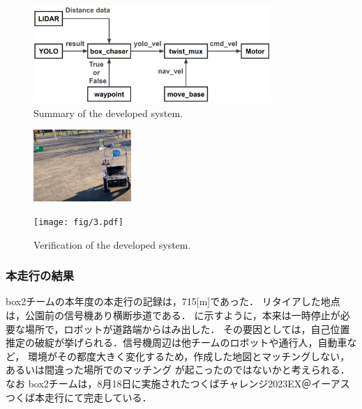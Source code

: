 \documentclass[twocolumn, 9pt]{jsproceedings}
\begin{document}
\begin{figure}[h!]
  \centering
  \includegraphics[width=90mm]{fig/act.pdf}
  \caption{Summary of the developed system.}
  \label{fig:hako_act}
\end{figure}

\vspace*{-1zh}

\begin{figure}[h]
  \centering
  \begin{minipage}[b]{0.45\linewidth}
    \centering
    \includegraphics[width=37mm]{fig/1.pdf}
    \caption*{(a) Found the box}
  \end{minipage} 
  \hspace*{2mm}
  \begin{minipage}[b]{0.45\linewidth}
    \centering
    \texttt{[image: fig/3.pdf]}
    \caption*{\hspace*{-1mm}(b) Stop near the box}
  \end{minipage}
  \caption{Verification of the developed system.}
  \label{fig:action}
\end{figure}







\subsubsection{本走行の結果}
box2チームの本年度の本走行の記録は，715[m]であった．
リタイアした地点は，公園前の信号機あり横断歩道である．
に示すように，本来は一時停止が必要な場所で，ロボットが道路端からはみ出した．
その要因としては，自己位置推定の破綻が挙げられる．信号機周辺は他チームのロボットや通行人，自動車など，
環境がその都度大きく変化するため，作成した地図とマッチングしない，あるいは間違った場所でのマッチング
が起こったのではないかと考えられる．
なお box2チームは，8月18日に実施されたつくばチャレンジ2023EX＠イーアスつくば本走行にて完走している．
\end{document}
